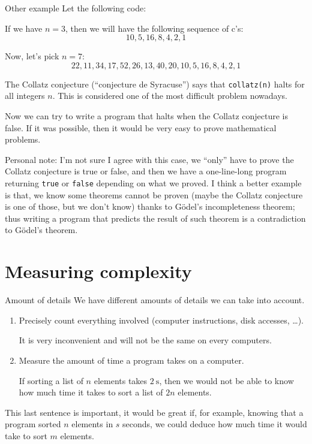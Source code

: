\documentclass[a4paper]{article}
\begin{document}
\begin{parag}{Other example}
    Let the following code:

    If we have $n = 3$, then we will have the following sequence of c's:
    \[10, 5, 16, 8, 4, 2, 1\]

    Now, let's pick $n = 7$:
    \[22, 11, 34, 17, 52, 26, 13, 40, 20, 10, 5, 16, 8, 4, 2, 1\]

    The Collatz conjecture (``conjecture de Syracuse'') says that \texttt{collatz(n)} halts for all integers $n$. This is considered one of the most difficult problem nowadays.

    Now we can try to write a program that halts when the Collatz conjecture is false. If it was possible, then it would be very easy to prove mathematical problems.

    \vspace{1em}

    Personal note: I'm not sure I agree with this case, we ``only'' have to prove the Collatz conjecture is true or false, and then we have a one-line-long program returning \texttt{true} or \texttt{false} depending on what we proved. I think a better example is that, we know some theorems cannot be proven (maybe the Collatz conjecture is one of those, but we don't know) thanks to Gödel's incompleteness theorem; thus writing a program that predicts the result of such theorem is a contradiction to Gödel's theorem.
\end{parag}


\section{Measuring complexity}
\begin{parag}{Amount of details}
    We have different amounts of details we can take into account.
    \begin{enumerate}
        \item Precisely count everything involved (computer instructions, disk accesses, \ldots).

            It is very inconvenient and will not be the same on every computers.
        \item Measure the amount of time a program takes on a computer.

            If sorting a list of $n$ elements takes $\SI{2}{\second }$, then we would not be able to know how much time it takes to sort a list of $2n$ elements.
    \end{enumerate}

    This last sentence is important, it would be great if, for example, knowing that a program sorted $n$ elements in $s$ seconds, we could deduce how much time it would take to sort $m$ elements.
\end{parag}
\end{document}
